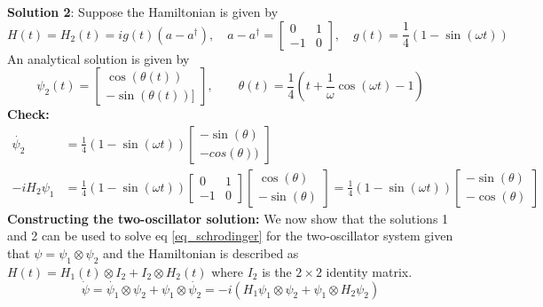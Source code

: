 \documentclass[11pt]{article}
\begin{document}
\textbf{Solution 2}: Suppose the Hamiltonian is given by
\begin{equation}
    H(t)=H_2(t) = ig(t)(a-a^\dag), \quad a-a^\dag =
    \begin{bmatrix}
        0 & 1\\
        -1 & 0
    \end{bmatrix}, \quad g(t) = \frac{1}{4}(1-\sin(\omega t))
\end{equation}
An analytical solution is given by
\begin{equation}
    \psi_2(t) = \begin{bmatrix}
                    \cos(\theta(t))\\
                    -\sin(\theta(t))]
                \end{bmatrix}, \quad \quad \theta(t) = \frac{1}{4}(t+\frac{1}{\omega}\cos(\omega t)-1)
\end{equation}
\textbf{Check:}
\begin{align}
    \dot{\psi_2} &= \frac{1}{4}(1-\sin(\omega t)) \begin{bmatrix} -\sin(\theta)\\
                                    -cos(\theta)) \end{bmatrix}\\
    -iH_2\psi_1 &= \frac{1}{4}(1-\sin(\omega t))\begin{bmatrix} 0 & 1\\ -1 & 0 \end{bmatrix}
                                            \begin{bmatrix} \cos(\theta) \\ -\sin(\theta) \end{bmatrix} =
                                            \frac{1}{4}(1-\sin(\omega t)) \begin{bmatrix} -\sin(\theta)\\
                                            -\cos(\theta) \end{bmatrix}
\end{align}
\textbf{Constructing the two-oscillator solution:}
We now show that the solutions 1 and 2 can be used to solve eq \eqref{eq_schrodinger} for the two-oscillator system given that $\psi = \psi_1 \otimes \psi_2$ and the Hamiltonian is described as $H(t) = H_1(t)\otimes I_2 + I_2 \otimes H_2(t)$ where $I_2$ is the $2\times2$ identity matrix.
\begin{equation}\label{psidot}
    \dot{\psi} = \dot{\psi_1}\otimes \psi_2 + \psi_1 \otimes \dot{\psi_2} = -i(H_1\psi_1\otimes \psi_2
                    + \psi_1\otimes H_2\psi_2)
\end{equation}
\end{document}
